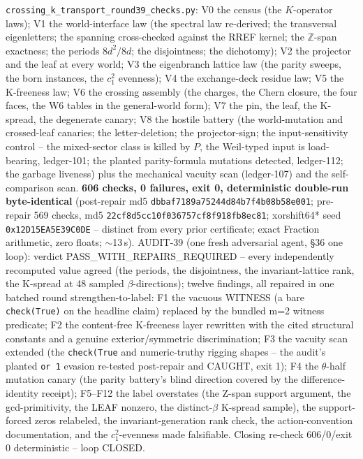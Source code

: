 \documentclass[11pt]{article}
\begin{document}
\texttt{crossing\_k\_transport\_round39\_checks.py}: V0 the census (the
$K$-operator laws); V1 the world-interface law (the spectral law re-derived;
the transversal eigenletters; the spanning cross-checked against the RREF
kernel; the $\mathbb{Z}$-span exactness; the periods $8d^2/8d$; the
disjointness; the dichotomy); V2 the projector and the leaf at every world;
V3 the eigenbranch lattice law (the parity sweeps, the born instances, the
$c_1^2$ evenness); V4 the exchange-deck residue law; V5 the K-freeness law;
V6 the crossing assembly (the charges, the Chern closure, the four faces, the
W6 tables in the general-world form); V7 the pin, the leaf, the K-spread, the
degenerate canary; V8 the hostile battery (the world-mutation and
crossed-leaf canaries; the letter-deletion; the projector-sign; the
input-sensitivity control -- the mixed-sector class is killed by $P$, the
Weil-typed input is load-bearing, ledger-101; the planted parity-formula
mutations detected, ledger-112; the garbage liveness) plus the mechanical
vacuity scan (ledger-107) and the self-comparison scan.
\textbf{606 checks, 0 failures, exit 0, deterministic double-run
byte-identical} (post-repair md5 \texttt{dbbaf7189a75244d84b7f4b08b58e001};
pre-repair 569 checks, md5 \texttt{22cf8d5cc10f036757cf8f918fb8ec81};
xorshift64* seed \texttt{0x12D15EA5E39C0DE} -- distinct from every prior
certificate; exact Fraction arithmetic, zero floats; $\sim$13\,s).
AUDIT-39 (one fresh adversarial agent, \S36 one loop): verdict
PASS\_WITH\_REPAIRS\_REQUIRED -- every independently recomputed value agreed
(the periods, the disjointness, the invariant-lattice rank, the K-spread at
48 sampled $\beta$-directions); twelve findings, all repaired in one batched
round strengthen-to-label: F1 the vacuous WITNESS (a bare \texttt{check(True)}
on the headline claim) replaced by the bundled m=2 witness predicate; F2 the
content-free K-freeness layer rewritten with the cited structural constants
and a genuine exterior/symmetric discrimination; F3 the vacuity scan
extended (the \texttt{check(True} and numeric-truthy rigging shapes -- the
audit's planted \texttt{or 1} evasion re-tested post-repair and CAUGHT,
exit 1); F4 the $\theta$-half mutation canary (the parity battery's blind
direction covered by the difference-identity receipt); F5--F12 the label
overstates (the Z-span support argument, the gcd-primitivity, the LEAF
nonzero, the distinct-$\beta$ K-spread sample), the support-forced zeros
relabeled, the invariant-generation rank check, the action-convention
documentation, and the $c_1^2$-evenness made falsifiable. Closing re-check
606/0/exit 0 deterministic -- loop CLOSED.
\end{document}

